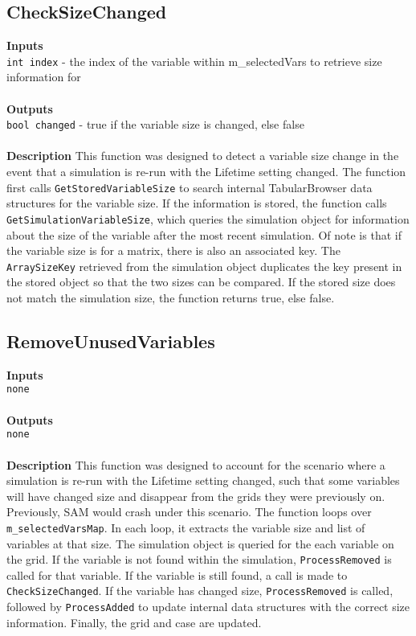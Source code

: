 \documentclass[11pt]{article} %
\begin{document}
\subsection{CheckSizeChanged}
\textbf{Inputs} \\
\texttt{int index} - the index of the variable within m\_selectedVars to retrieve size information for \\
\\
\textbf{Outputs}\\
\texttt{bool changed} - true if the variable size is changed, else false \\
\\
\textbf{Description}
This function was designed to detect a variable size change in the event that a simulation is re-run with the Lifetime setting changed.  The function first calls \texttt{GetStoredVariableSize} to search internal TabularBrowser data structures for the variable size.  If the information is  stored, the function calls \\ \texttt{GetSimulationVariableSize}, which queries the simulation object for information about the size of the variable after the most recent simulation.  Of note is that if the variable size is for a matrix, there is also an associated key.  The \texttt{ArraySizeKey} retrieved from the simulation object duplicates the key present in the stored object so that the two sizes can be compared.  If the stored size does not match the simulation size, the function returns true, else false.

\subsection{RemoveUnusedVariables}
\textbf{Inputs} \\
\texttt{none} \\
\\
\textbf{Outputs}\\
\texttt{none} \\
\\
\textbf{Description}
This function was designed to account for the scenario where a simulation is re-run with the Lifetime setting changed, such that some variables will have changed size and disappear from the grids they were previously on.  Previously, SAM would crash under this scenario.  The function loops over \texttt{m\_selectedVarsMap}. In each loop, it extracts the variable size and list of variables at that size.  The simulation object is queried for the each variable on the grid.  If the variable is not found within the simulation, \texttt{ProcessRemoved} is called for that variable.  If the variable is still found, a call is made to \texttt{CheckSizeChanged}.  If the variable has changed size, \texttt{ProcessRemoved} is called, followed by \texttt{ProcessAdded} to update internal data structures with the correct size information.  Finally, the grid and case are updated.
\end{document}
